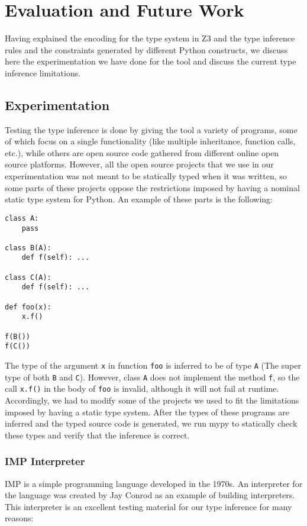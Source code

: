 
\chapter{Evaluation and Future Work}\label{chapter:eval}
Having explained the encoding for the type system in Z3 and the type inference rules and the constraints generated by different Python constructs, we discuss here the experimentation we have done for the tool and discuss the current type inference limitations.

\section{Experimentation}
Testing the type inference is done by giving the tool a variety of programs, some of which focus on a single functionality (like multiple inheritance, function calls, etc.), while others are open source code gathered from different online open source platforms. However, all the open source projects that we use in our experimentation was not meant to be statically typed when it was written, so some parts of these projects oppose the restrictions imposed by having a nominal static type system for Python. An example of these parts is the following:

\begin{lstlisting}
class A:
	pass
	
class B(A):
	def f(self): ...

class C(A):
	def f(self): ...

def foo(x):
	x.f()
	
f(B())
f(C())
\end{lstlisting}

The type of the argument \lstinline|x| in function \lstinline|foo| is inferred to be of type \lstinline|A| (The super type of both \lstinline|B| and \lstinline|C|). However, class \lstinline|A| does not implement the method \lstinline|f|, so the call \lstinline|x.f()| in the body of \lstinline|foo| is invalid, although it will not fail at runtime. Accordingly, we had to modify some of the projects we used to fit the limitations imposed by having a static type system. After the types of these programs are inferred and the typed source code is generated, we run mypy \cite{mypy} to statically check these types and verify that the inference is correct.
\subsection{IMP Interpreter}
IMP \cite{imp} is a simple programming language developed in the 1970s. An interpreter for the language \cite{imp_i} was created by Jay Conrod as an example of building interpreters. This interpreter is an excellent testing material for our type inference for many reasons:

